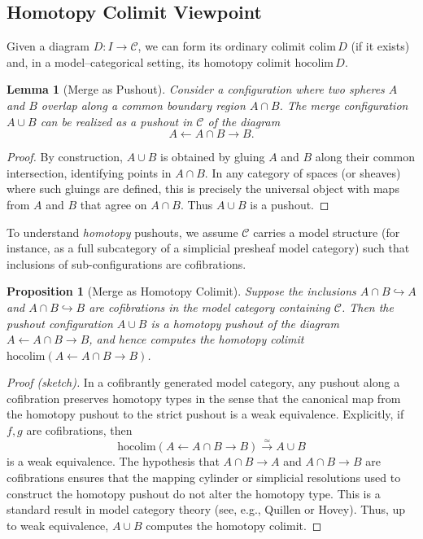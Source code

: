 \documentclass[12pt]{article}
\theoremstyle{plain}
\newtheorem{proposition}[theorem]{Proposition}
\newtheorem{lemma}[theorem]{Lemma}
\theoremstyle{definition}
\theoremstyle{remark}
\begin{document}
\subsection{Homotopy Colimit Viewpoint}

Given a diagram $D: I \to \mathcal{C}$, we can form its ordinary colimit
$\mathrm{colim}\, D$ (if it exists) and, in a model--categorical setting, its
homotopy colimit $\mathrm{hocolim}\, D$.

\begin{lemma}[Merge as Pushout]
\label{lem:merge-pushout}
Consider a configuration where two spheres $A$ and $B$ overlap along a common
boundary region $A\cap B$. The \emph{merge} configuration $A\cup B$ can be
realized as a pushout in $\mathcal{C}$ of the diagram
\[
    A \leftarrow A\cap B \rightarrow B.
\]
\end{lemma}

\begin{proof}
By construction, $A\cup B$ is obtained by gluing $A$ and $B$ along their common
intersection, identifying points in $A\cap B$. In any category of spaces (or
sheaves) where such gluings are defined, this is precisely the universal object
with maps from $A$ and $B$ that agree on $A\cap B$. Thus $A\cup B$ is a pushout.
\end{proof}

To understand \emph{homotopy} pushouts, we assume $\mathcal{C}$ carries a model
structure (for instance, as a full subcategory of a simplicial presheaf model
category) such that inclusions of sub-configurations are cofibrations.

\begin{proposition}[Merge as Homotopy Colimit]
\label{prop:merge-hocolim}
Suppose the inclusions $A\cap B \hookrightarrow A$ and $A\cap B \hookrightarrow
B$ are cofibrations in the model category containing $\mathcal{C}$. Then the
pushout configuration $A\cup B$ is a homotopy pushout of the diagram
$A \leftarrow A\cap B \rightarrow B$, and hence computes the homotopy colimit
$\mathrm{hocolim}(A \leftarrow A\cap B \rightarrow B)$.
\end{proposition}

\begin{proof}[Proof (sketch)]
In a cofibrantly generated model category, any pushout along a cofibration
preserves homotopy types in the sense that the canonical map from the homotopy
pushout to the strict pushout is a weak equivalence. Explicitly, if $f,g$ are
cofibrations, then
\[
    \mathrm{hocolim}(A \leftarrow A\cap B \rightarrow B)
    \xrightarrow{\simeq}
    A\cup B
\]
is a weak equivalence. The hypothesis that $A\cap B\to A$ and $A\cap B\to B$
are cofibrations ensures that the mapping cylinder or simplicial resolutions
used to construct the homotopy pushout do not alter the homotopy type. This
is a standard result in model category theory (see, e.g., Quillen or Hovey).
Thus, up to weak equivalence, $A\cup B$ computes the homotopy colimit.
\end{proof}
\end{document}
